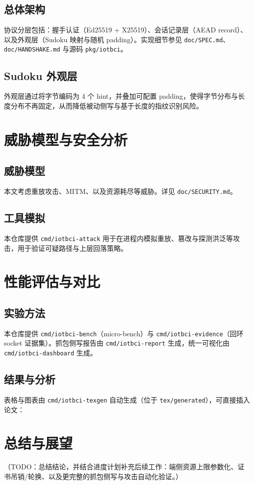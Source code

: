 \documentclass[bachelor]{thesis-uestc}
\begin{document}
\section{总体架构}
协议分层包括：握手认证（Ed25519 + X25519）、会话记录层（AEAD record）、以及外观层（Sudoku 映射与随机 padding）。实现细节参见 \texttt{doc/SPEC.md}、\texttt{doc/HANDSHAKE.md} 与源码 \texttt{pkg/iotbci}。

\section{Sudoku 外观层}
外观层通过将字节编码为 4 个 hint，并叠加可配置 padding，使得字节分布与长度分布不再固定，从而降低被动侧写与基于长度的指纹识别风险。

\chapter{威胁模型与安全分析}
\section{威胁模型}
本文考虑重放攻击、MITM、以及资源耗尽等威胁。详见 \texttt{doc/SECURITY.md}。

\section{工具模拟}
本仓库提供 \texttt{cmd/iotbci-attack} 用于在进程内模拟重放、篡改与探测洪泛等攻击，用于验证可疑路径与上层回落策略。

\chapter{性能评估与对比}
\section{实验方法}
本仓库提供 \texttt{cmd/iotbci-bench}（micro-bench）与 \texttt{cmd/iotbci-evidence}（回环 socket 证据集）。抓包侧写报告由 \texttt{cmd/iotbci-report} 生成，统一可视化由 \texttt{cmd/iotbci-dashboard} 生成。

\section{结果与分析}
表格与图表由 \texttt{cmd/iotbci-texgen} 自动生成（位于 \texttt{tex/generated}），可直接插入论文：



\chapter{总结与展望}
（TODO：总结结论，并结合进度计划补充后续工作：端侧资源上限参数化、证书吊销/轮换、以及更完整的抓包侧写与攻击自动化验证。）

\end{document}
